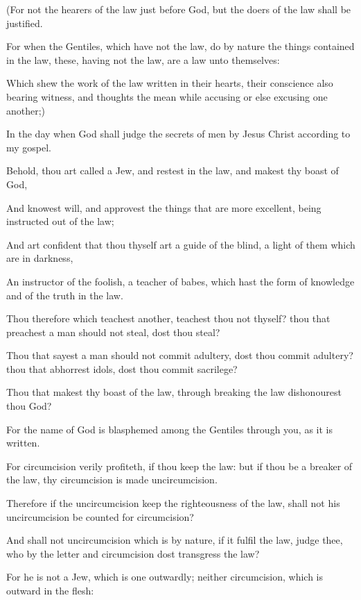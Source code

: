 {(For
not the
hearers of the
law
{}
just
before
God,
but the
doers of the
law shall be
justified.

For
when the
Gentiles, which
have
not the
law,
do by
nature the
things contained in the
law,
these,
having
not the
law,
are a
law unto
themselves:

Which
shew the
work of the
law
written
in
their
hearts,
their
conscience also bearing
witness,
and
{}
thoughts the mean
while
accusing or
else
excusing one
another;)

In the
day
when
God shall
judge the
secrets of
men
by
Jesus
Christ according
to
my
gospel.


\par }{\PP {}Behold,
thou art
called a
Jew,
and
restest in the
law,
and makest thy
boast
of
God,

And
knowest
{}
will,
and
approvest the things that are more
excellent, being
instructed out
of the
law;

And art confident
that thou
thyself
art a
guide of the
blind, a
light of
them which are
in
darkness,

An
instructor of the
foolish, a
teacher of
babes, which
hast the
form of
knowledge
and of the
truth
in the
law.

Thou
therefore which
teachest
another, teachest
thou
not
thyself? thou that
preachest a man should
not
steal, dost thou
steal?

Thou that
sayest a man should
not commit
adultery, dost thou commit
adultery? thou that
abhorrest
idols, dost thou commit
sacrilege?

Thou
that makest thy
boast
of the
law,
through
breaking the
law dishonourest
thou
God?

For the
name of
God is
blasphemed
among the
Gentiles
through
you,
as it is
written.

For
circumcision
verily
profiteth,
if thou
keep the
law:
but
if thou
be a
breaker of the
law,
thy
circumcision is
made
uncircumcision.

Therefore
if the
uncircumcision
keep the
righteousness of the
law, shall
not
his
uncircumcision be
counted
for
circumcision?

And shall
not
uncircumcision which is
by
nature, if it
fulfil the
law,
judge
thee,
who
by the
letter
and
circumcision dost
transgress the
law?

For
he
is
not a
Jew, which is
one
outwardly;
neither
{}
circumcision, which is
outward
in the
flesh:

}

